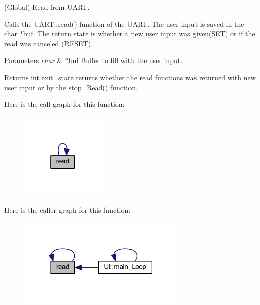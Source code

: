 (Global) Read from U\+A\+RT. 

Calls the U\+A\+R\+T\+::read() function of the U\+A\+RT. The user input is saved in the char $\ast$buf. The return state is whether a new user input was given(\+S\+E\+T) or if the read was canceled (R\+E\+S\+ET).


\begin{DoxyParams}{Parameters}
{\em char} & $\ast$buf Buffer to fill with the user input. \\
\hline
\end{DoxyParams}
\begin{DoxyReturn}{Returns}
int exit\+\_\+state returns whether the read functions was returned with new user input or by the \mbox{\hyperlink{namespace_i_o_a04c5db8c053f07761c5c09894a4bd49d}{stop\+\_\+\+Read()}} function. 
\end{DoxyReturn}
Here is the call graph for this function\+:\nopagebreak
\begin{figure}[H]
\begin{center}
\leavevmode
\includegraphics[width=115pt]{namespace_i_o_a1087fba97ca797e5ca155228ff9eec55_cgraph}
\end{center}
\end{figure}
Here is the caller graph for this function\+:\nopagebreak
\begin{figure}[H]
\begin{center}
\leavevmode
\includegraphics[width=230pt]{namespace_i_o_a1087fba97ca797e5ca155228ff9eec55_icgraph}
\end{center}
\end{figure}
\mbox{\label{namespace_i_o_a04c5db8c053f07761c5c09894a4bd49d}} 
